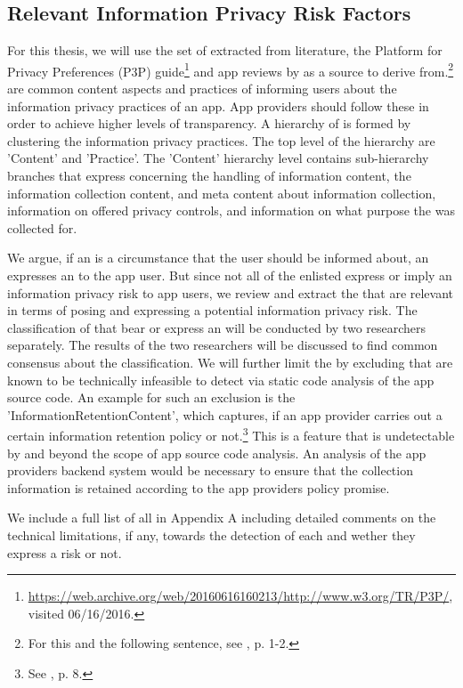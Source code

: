 \subsection{Relevant Information Privacy Risk Factors}\label{chapter:Relevant}

For this thesis, we will use the set of \ipp extracted from literature, the Platform for Privacy Preferences (\acs{P3P}) guide\footnote{\url{https://web.archive.org/web/20160616160213/http://www.w3.org/TR/P3P/}, visited 06/16/2016.} and app reviews by \cite{Dehling2016} as a source to derive \iprfs from.\footnote{For this and the following sentence, see \cite{Dehling2016}, p. 1-2.} 
\Ipp are common content aspects and practices of informing users about the information privacy practices of an app. 
App providers should follow these \ipp in order to achieve higher levels of transparency.
A hierarchy of \ipp is formed by clustering the information privacy practices. 
The top level of the hierarchy are 'Content' and 'Practice'.
The 'Content' hierarchy level contains sub-hierarchy branches that express \ipp concerning the handling of information content, the information collection content, and meta content about information collection, information on offered privacy controls, and information on what purpose the \ipp was collected for.

We argue, if an \ipp is a circumstance that the user should be informed about, an \ipp expresses an \ipr to the app user.
But since not all of the enlisted \ipp express or imply an information privacy risk to app users, we review and extract the \ipp that are relevant in terms of posing and expressing a potential information privacy risk.
The classification of \ipp that bear or express an \ipr will be conducted by two researchers separately.
The results of the two researchers will be discussed to find common consensus about the classification.
We will further limit the \ipp by excluding \ipp that are known to be technically infeasible to detect via static code analysis of the app source code.
An example for such an exclusion is the \ipp 'InformationRetentionContent', which captures, if an app provider carries out a certain information retention policy or not.\footnote{See \cite{Dehling2016}, p. 8.}
This is a feature that is undetectable by \sca and beyond the scope of app source code analysis.
An analysis of the app providers backend system would be necessary to ensure that the collection information is retained according to the app providers policy promise.

We include a full list of all \ipp in Appendix A including detailed comments on the technical limitations, if any, towards the \sca detection of each \ipp and wether they express a risk or not.

